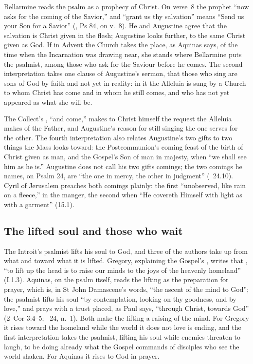 Bellarmine reads the psalm as a prophecy of Christ. On verse~8 the prophet
``now asks for the coming of the Savior,'' and ``grant us thy salvation''
means ``Send us your Son for a Savior'' (, Ps 84, on v.~8).
He and Augustine agree that the salvation is Christ given in the flesh;
Augustine looks further, to the same Christ given as God. If in Advent the
Church takes the place, as Aquinas says, of the time when the Incarnation was
drawing near, she stands where Bellarmine puts the psalmist, among those who
ask for the Saviour before he comes. The second interpretation takes one
clause of Augustine's sermon, that those who sing are sons of God by faith and
not yet in reality: in it the Alleluia is sung by a Church to whom Christ has
come and in whom he still comes, and who has not yet appeared as what she will
be.

The Collect's , ``and come,'' makes to Christ himself the
request the Alleluia makes of the Father, and Augustine's reason for still
singing the one serves for the other. The fourth interpretation also relates
Augustine's two gifts to two things the Mass looks toward: the
Postcommunion's coming feast of the birth of Christ given as man, and the
Gospel's Son of man in majesty, when ``we shall see him as he is.''
Augustine does not call his two gifts comings; the two comings he names, on
Psalm 24, are ``the one in mercy, the other in judgment'' (~24.10). Cyril of Jerusalem preaches both
comings plainly: the first ``unobserved, like rain on a fleece,'' in the
manger, the second when ``He covereth Himself with light as with a garment''
(15.1).

\subsection{The lifted soul and those who wait}

The Introit's psalmist lifts his soul to God, and three of the authors take
up from what and toward what it is lifted. Gregory, explaining the Gospel's
, writes that , ``to lift up the head is to raise our
minds to the joys of the heavenly homeland'' (I.1.3). Aquinas, on the psalm
itself, reads the lifting as the preparation for prayer, which is, in St John
Damascene's words, ``the ascent of the mind to God''; the psalmist lifts his
soul ``by contemplation, looking on thy goodness, and by love,'' and prays
with a trust placed, as Paul says, ``through Christ, towards God'' (2~Cor
3:4--5; ~24, n.~1). Both make the lifting a raising of the
mind. For Gregory it rises toward the homeland while the world it does not
love is ending, and the first interpretation takes the psalmist, lifting his
soul while enemies threaten to laugh, to be doing already what the Gospel
commands of disciples who see the world shaken. For Aquinas it rises to God
in prayer.


